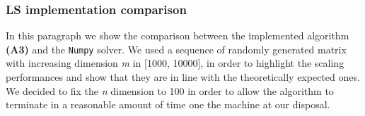 \subsubsection{LS implementation comparison}
In this paragraph we show the comparison between the implemented algorithm \textbf{(A3)} and the \texttt{Numpy} solver. We used a sequence of randomly generated matrix with increasing dimension \textit{m} in [1000, 10000], in order to highlight the scaling performances and show that they are in line with the theoretically expected ones. We decided to fix the \textit{n} dimension to 100 in order to allow the algorithm to terminate in a reasonable amount of time one the machine at our disposal.

\begin{figure}[H]
	\centering
	\begin{subfigure}{.4\textwidth}
	    \centering
	\end{subfigure}
	\begin{subfigure}{.4\textwidth}
	    \centering
	\end{subfigure}
	

\end{figure}

